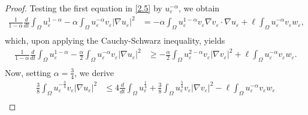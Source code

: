 \documentclass[12pt]{article}
\theoremstyle{plain}
\theoremstyle{definition}
\numberwithin{equation}{section}
\begin{document}
\begin{proof}
    Testing the first equation in \eqref{2.5} by $u_\varepsilon^{-\alpha}$, we obtain
    \begin{equation*}
    \begin{split}
        \frac{1}{1-\alpha}\frac{d}{dt}\int_\Omega u_\varepsilon^{1-\alpha}-\alpha\int_\Omega u_\varepsilon^{-\alpha} v_\varepsilon|\nabla u_\varepsilon|^2
        &= -\alpha\int_\Omega u_\varepsilon^{1-\alpha}v_\varepsilon\nabla v_\varepsilon\cdot\nabla u_\varepsilon+\ell\int_\Omega u_\varepsilon^{-\alpha}v_\varepsilon w_\varepsilon,\\
        \end{split}
    \end{equation*}
    which, upon applying the Cauchy-Schwarz inequality, yields
    \begin{equation*}
    \begin{split}
        \frac{1}{1-\alpha}\frac{d}{dt}\int_\Omega u_\varepsilon^{1-\alpha}-\frac{\alpha}2\int_\Omega u_\varepsilon^{-\alpha} v_\varepsilon|\nabla u_\varepsilon|^2
        &\geq -\frac{\alpha}2\int_\Omega u_\varepsilon^{2-\alpha}v_\varepsilon|\nabla v_\varepsilon|^2+\ell\int_\Omega u_\varepsilon^{-\alpha}v_\varepsilon w_\varepsilon.\\
        \end{split}
    \end{equation*}
  Now, setting $\alpha=\frac{3}{4}$, we derive
    \begin{equation}\label{3.5}
    \begin{split}
         \frac{3}8\int_\Omega u_\varepsilon^{-\frac{3}{4}} v_\varepsilon|\nabla u_\varepsilon|^2
         &\leq 4\frac{d}{dt}\int_\Omega u_\varepsilon^{\frac1 4}+\frac{3}{8}\int_\Omega u_\varepsilon^{\frac5 4}v_\varepsilon|\nabla v_\varepsilon|^2-\ell\int_\Omega u_\varepsilon^{-\alpha}v_\varepsilon w_\varepsilon\\

\end{split}
\end{equation}
\end{proof}
\end{document}
